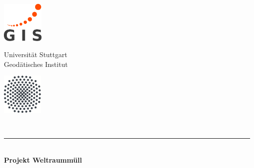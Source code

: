 \documentclass{article}
\begin{document}
\begin{minipage}[c][\textheight][t]{\textwidth}
	\centering
	\begin{minipage}[c]{2cm}%
		\includegraphics[height=2cm]{bilder/logo_gi}%
	\end{minipage}
	\hfill
	\begin{minipage}[c]{8cm}
		\centering
		\vspace*{2mm}
		\LARGE Universität Stuttgart\\[3mm]
		\Large Geodätisches Institut
	\end{minipage}
	\hfill
	\begin{minipage}[c]{2cm}%
		\includegraphics[height=2cm]{bilder/logo_uni-stuttgart.png}%
	\end{minipage}\\[5mm]
	\rule{\textwidth}{0.5pt}\\[10mm]
	
	\vspace*{1cm} %
	{\huge {\textbf{Projekt Weltraummüll}}}\\[10mm]
	\vspace*{1cm} %
	

\end{minipage}
\end{document}
